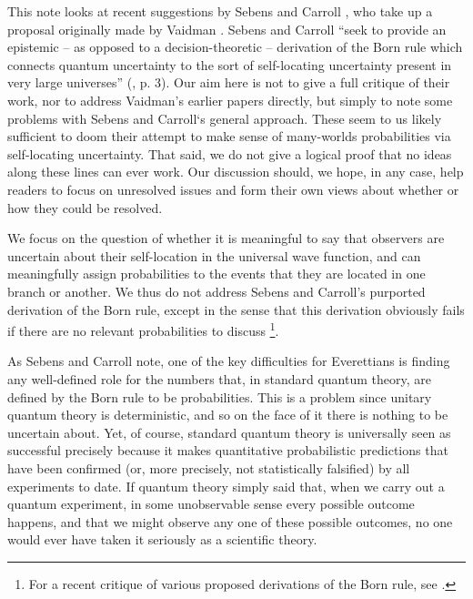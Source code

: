 \documentclass[aps,prl]{revtex4}
\begin{document}
This note looks at recent suggestions by
Sebens and Carroll \cite{cs1,cs2}, who take up a proposal
originally made by Vaidman \cite{vaidman1998,vaidman2008,vaidman2011}. 
Sebens and Carroll 
 ``seek to provide an epistemic -- as
opposed to a decision-theoretic -- derivation of the Born rule which
connects quantum uncertainty to the sort of self-locating uncertainty
present in very large universes'' (\cite{cs1}, p. 3).  
Our aim here is not to give a full critique of their work, nor 
to address Vaidman's earlier papers directly,  
but simply to note some problems with 
Sebens and Carroll`s general approach. 
These seem to us likely sufficient
to doom their attempt to make sense of many-worlds probabilities
via self-locating uncertainty.  That said, we do not give a  
logical proof that no ideas along these lines can ever work.
Our discussion should, we hope, in any case, help readers
to focus on unresolved issues and form their own views 
about whether or how they could be resolved.  

We focus on the question of whether it is meaningful
to say that observers are uncertain about their self-location
in the universal wave function, and can meaningfully assign
probabilities to the events that they are located in one branch
or another.  We thus do not address Sebens and Carroll's 
purported derivation of the Born rule, except in the sense
that this derivation obviously fails if there are no relevant
probabilities to discuss \footnote{For a recent critique of
various proposed derivations of the Born 
rule, see \cite{kastner2014einselection}.}. 

As Sebens and Carroll note, one of the key difficulties for Everettians is
finding any well-defined role for the numbers that, in standard
quantum theory, are defined by the Born rule to be probabilities.
This is a problem since unitary quantum theory is deterministic,
and so on the face of it there is nothing to be uncertain about.
Yet, of course, standard quantum theory is universally seen as
successful precisely because it makes quantitative probabilistic predictions
that have been confirmed (or, more precisely, not statistically 
falsified) by all experiments to date.   If quantum theory simply
said that, when we
carry out a quantum experiment, in some unobservable sense every
possible outcome happens, 
and that we might observe any one of these possible outcomes, 
no one would ever have taken it
seriously as a scientific theory.  
\end{document}
